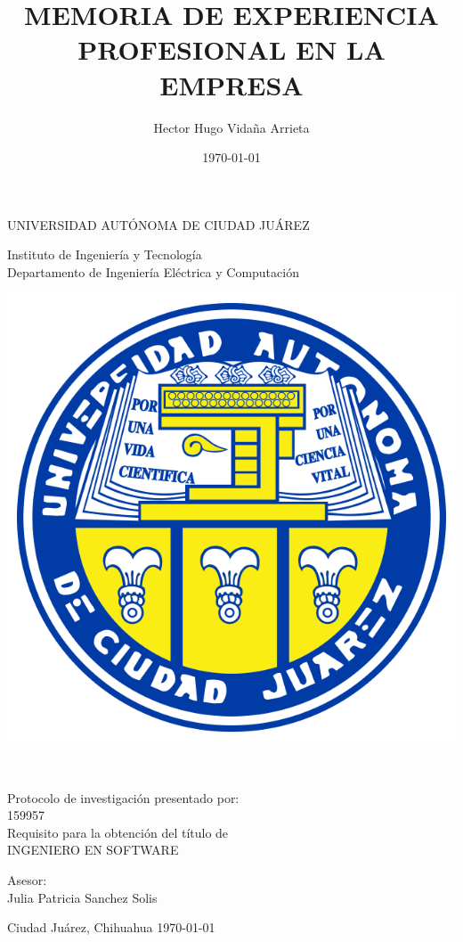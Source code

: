 \documentclass[final, fmstyle, 12pt]{article}
\title{MEMORIA DE EXPERIENCIA PROFESIONAL EN LA EMPRESA}
\author{Hector Hugo Vidaña Arrieta}
\date{\today}
\begin{document}
\renewcommand{\tablename}{Tabla}
	\thispagestyle{empty}
\begin{center} \vfill
{\Large UNIVERSIDAD AUTÓNOMA DE CIUDAD JUÁREZ}\\
\vspace{6mm}
{\large Instituto de Ingeniería y Tecnología\\
\vspace{6mm}
Departamento de Ingeniería Eléctrica y Computación
\vspace{20mm}

\includegraphics [scale=0.7]{imagenes/escudo-uacj} 
\vspace{10mm}


\thetitle\\
\vspace{15mm}

Protocolo de investigación presentado por:\\
\vspace{6mm}
\theauthor\hspace{10mm} 159957\\
\vspace{10mm}
Requisito para la obtención del título de\\
\vspace{6mm}
INGENIERO EN SOFTWARE\\
\vspace{10mm}

Asesor:\\
{Julia Patricia Sanchez Solis}\\
} \vfill
	Ciudad Juárez, Chihuahua \hspace{70mm}\today

\clearpage

\end{center}
\end{document}
